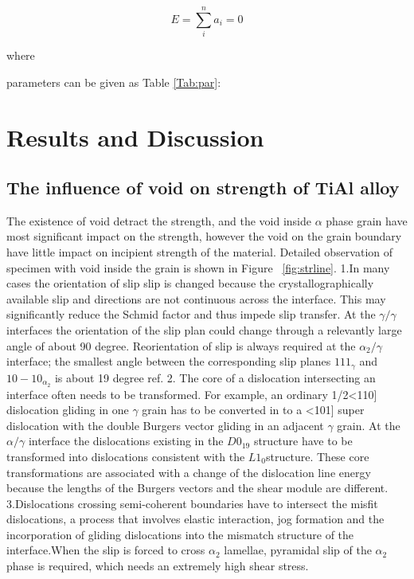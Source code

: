 \documentclass[final,5p,times,twocolumn]{elsarticle}
\begin{document}
$$E=\sum_{i}^n a_i=0$$

where


parameters can be given as Table \ref{Tab:par}:



\section{Results and Discussion}

\subsection{The influence of void on strength of TiAl alloy}

The existence of void detract the strength, and the void inside $\alpha$ phase grain have most significant  impact on the strength, however the void on the grain boundary have little impact on incipient strength of the material. Detailed observation of specimen with void inside the grain is shown in Figure ~\ref{fig:strline}.
1.In many cases the orientation of slip slip is changed because the crystallographically available slip and directions are not continuous across the interface. This may significantly reduce the Schmid factor and thus impede slip transfer. At the $\gamma/\gamma$ interfaces the orientation of the slip plan could change through a relevantly large angle of about 90 degree. Reorientation of slip is always required at the $\alpha_{2} / \gamma$ interface; the smallest angle between the corresponding slip planes ${1 1 1 }_{\gamma}$ and ${ 1 0 -1 0}_{\alpha_2}$ is about 19 degree ref{}.
2. The core of  a dislocation intersecting an interface often needs to be transformed. For example, an ordinary 1/2<110] dislocation gliding in one $\gamma$ grain has to be converted in to a <101] super dislocation with the double Burgers vector gliding in an adjacent $\gamma$ grain. At the $\alpha/\gamma$ interface the dislocations existing in the $D0_{19}$ structure have to be transformed into dislocations consistent with the $L1_0$structure. These core transformations are associated with a change of the dislocation line energy because the lengths of the Burgers vectors and the shear module are different.
3.Dislocations crossing semi-coherent boundaries have to intersect the misfit dislocations, a process that involves elastic interaction, jog formation and the incorporation of gliding dislocations into the mismatch structure of the interface.When the slip is forced to cross $\alpha_2$ lamellae, pyramidal slip of the $\alpha_2$ phase is required, which needs an extremely high shear stress.
\end{document}
